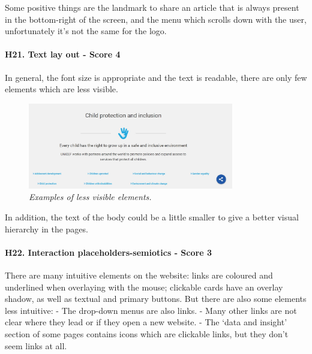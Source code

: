 \newline Some positive things are the landmark to share an article that is always present in the bottom-right of the screen, and the menu which scrolls down with the user, unfortunately it’s not the same for the logo.
\newline
\newline \paragraph{H21. Text lay out - Score 4}	In general, the font size is appropriate and the text is readable, there are only few elements which are less visible.
\begin{figure}[!h]
	\begin{center}
		\includegraphics[width=0.8\textwidth]{FinalScores24.jpg}
		\captionsetup{font=small}
		\caption{\textit{Examples of less visible elements.}}
	\end{center}
\end{figure}
\newline In addition, the text of the body could be a little smaller to give a better visual hierarchy in the pages.
\newline
\newline \paragraph{H22. Interaction placeholders-semiotics - Score 3}	There are many intuitive elements on the website: links are coloured and underlined when overlaying with the mouse; clickable cards have an overlay shadow, as well as textual and primary buttons.
\newline But there are also some elements less intuitive:
\newline -	The drop-down menus are also links.
\newline -	Many other links are not clear where they lead or if they open a new website.
\newline -	The ‘data and insight’ section of some pages contains icons which are clickable links, but they don’t seem links at all.
